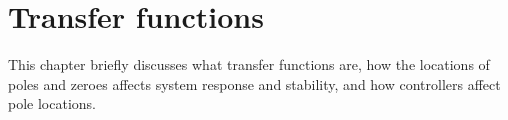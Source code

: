 
\chapter{Transfer functions}

This chapter briefly discusses what transfer functions are, how the locations of
poles and zeroes affects \gls{system response} and stability, and how
controllers affect pole locations.

\renewcommand*{\chapterpath}{\partpath/transfer-functions}






